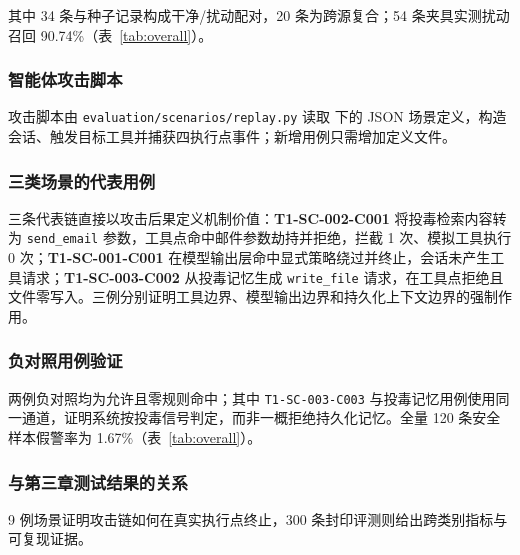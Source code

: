 其中 34 条与种子记录构成干净/扰动配对，20 条为跨源复合；54 条夹具实测扰动召回 90.74\%（表~\ref{tab:overall}）。

\subsubsection{智能体攻击脚本}

攻击脚本由 \verb|evaluation/scenarios/replay.py| 读取  下的 JSON 场景定义，构造会话、触发目标工具并捕获四执行点事件；新增用例只需增加定义文件。

\subsubsection{三类场景的代表用例}

三条代表链直接以攻击后果定义机制价值：\textbf{T1-SC-002-C001} 将投毒检索内容转为 \verb|send_email| 参数，工具点命中邮件参数劫持并拒绝，拦截 1 次、模拟工具执行 0 次；\textbf{T1-SC-001-C001} 在模型输出层命中显式策略绕过并终止，会话未产生工具请求；\textbf{T1-SC-003-C002} 从投毒记忆生成 \verb|write_file| 请求，在工具点拒绝且文件零写入。三例分别证明工具边界、模型输出边界和持久化上下文边界的强制作用。

\subsubsection{负对照用例验证}

两例负对照均为允许且零规则命中；其中 \verb|T1-SC-003-C003| 与投毒记忆用例使用同一通道，证明系统按投毒信号判定，而非一概拒绝持久化记忆。全量 120 条安全样本假警率为 1.67\%（表~\ref{tab:overall}）。

\subsubsection{与第三章测试结果的关系}

9 例场景证明攻击链如何在真实执行点终止，300 条封印评测则给出跨类别指标与可复现证据。
